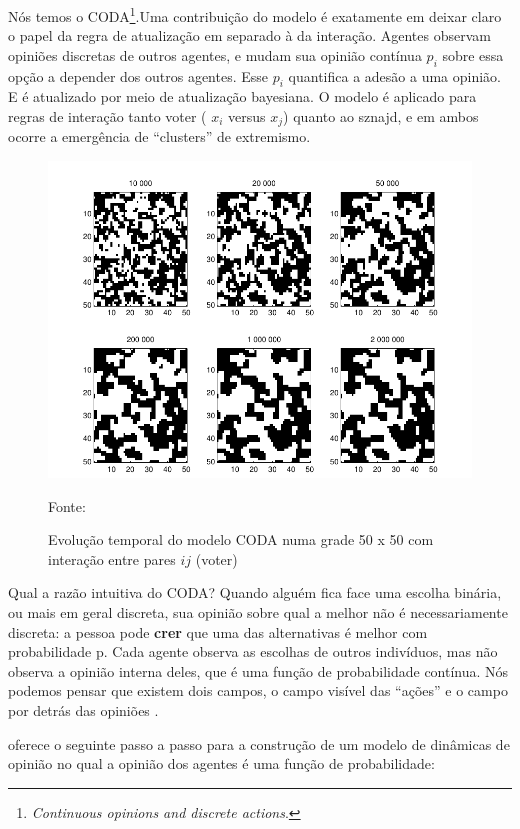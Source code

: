 \quad \quad Nós temos o CODA\cite{martins2008continuous}\footnote{\textit{Continuous
    opinions and discrete actions}.}.Uma contribuição do modelo é exatamente em
deixar claro o papel da regra de atualização em separado à da interação. Agentes
observam opiniões discretas de outros agentes, e mudam sua opinião contínua
$p_i$ sobre essa opção a depender dos outros agentes. Esse $p_i$ quantifica a
adesão a uma opinião. E é atualizado por meio de atualização bayesiana. O modelo
é aplicado para regras de interação tanto voter ( $x_i $ versus $x_j$) quanto ao
sznajd, e em ambos ocorre a emergência de ``clusters'' de extremismo. 

\begin{figure}[H]
  \centering \includegraphics[scale = 0.7]{ims/andre.png}
  \caption{Evolução temporal do modelo CODA numa grade 50 x 50 com
    interação entre pares $ij$ (voter)}
  Fonte: 
\end{figure}


Qual a razão intuitiva do CODA?  Quando alguém fica face uma escolha
binária, ou mais em geral discreta, sua opinião sobre qual a melhor
não é necessariamente discreta: a pessoa pode \textbf{crer} que uma
das alternativas é melhor com probabilidade p. Cada agente observa as
escolhas de outros indivíduos, mas não observa a opinião interna
deles, que é uma função de probabilidade contínua. Nós podemos pensar
que existem dois campos, o campo visível das ``ações'' e o campo por
detrás das opiniões \cite{martins2008continuous}.

  oferece o seguinte passo a passo
para a construção de um modelo de dinâmicas de opinião no qual a opinião dos
agentes é uma função de probabilidade:

